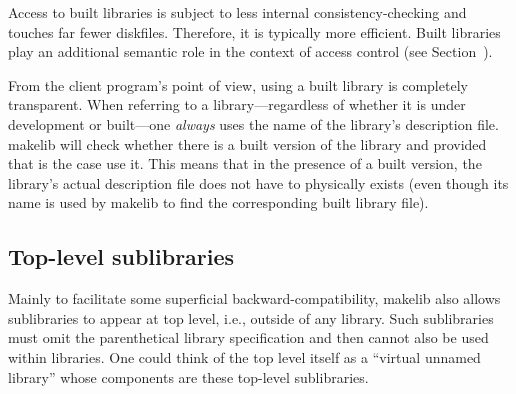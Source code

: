 Access to built libraries is subject to less internal
consistency-checking and touches far fewer diskfiles.
Therefore, it is typically more efficient.  Built libraries
play an additional semantic role in the context of access control (see
Section~).

From the client program's point of view, using a built library is
completely transparent.  When referring to a library---regardless of
whether it is under development or built---one {\em always} uses the
name of the library's description file.  makelib will check whether there
is a built version of the library and provided that is the case use
it.  This means that in the presence of a built version, the
library's actual description file does not have to physically exists
(even though its name is used by makelib to find the corresponding built
library file).

\subsection{Top-level sublibraries}

Mainly to facilitate some superficial backward-compatibility, makelib also
allows sublibraries to appear at top level, i.e., outside of any library.
Such sublibraries must omit the parenthetical library specification and then
cannot also be used within libraries. One could think of the top level
itself as a ``virtual unnamed library'' whose components are these
top-level sublibraries.
